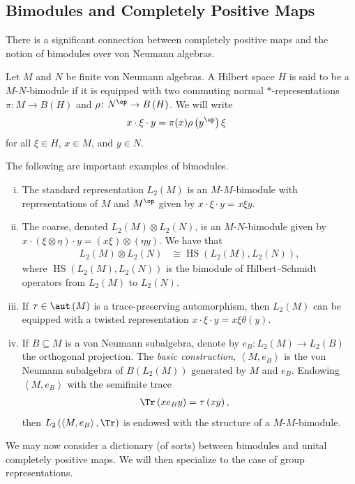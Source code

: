 \documentclass[10pt]{mypackage}
\begin{document}
\subsection{Bimodules and Completely Positive Maps}%
There is a significant connection between completely positive maps and the notion of bimodules over von Neumann algebras.
\begin{definition}
  Let $M$ and $N$ be finite von Neumann algebras. A Hilbert space $H$ is said to be a $M$-$N$-bimodule if it is equipped with two commuting normal $\ast$-representations $\pi\colon M\rightarrow B\left( H \right)$ and $\rho\colon N^{\op}\rightarrow B\left( H \right)$. We will write
  \begin{align*}
    x\cdot \xi \cdot y &= \pi(x)\rho\left( y^{\op} \right)\xi
  \end{align*}
  for all $\xi\in H$, $x\in M$, and $y\in N$.
\end{definition}
\begin{example}
  The following are important examples of bimodules.
  \begin{enumerate}[(i)]
    \item The standard representation $L_2\left( M \right)$ is an $M$-$M$-bimodule with representations of $M$ and $M^{\op}$ given by $x\cdot \xi \cdot y = x\xi y$.
    \item The coarse, denoted $L_2\left( M \right)\otimes L_2\left( N \right)$, is an $M$-$N$-bimodule given by $x\cdot \left( \xi\otimes \eta \right)\cdot y = \left( x\xi \right)\otimes \left( \eta y \right)$. We have that
      \begin{align*}
        L_2\left( M \right)\otimes L_2\left( N \right) &\cong \operatorname{HS}\left( L_2\left( M \right),L_2\left( N \right) \right),
      \end{align*}
      where $\operatorname{HS}\left( L_2\left( M \right),L_2\left( N \right) \right)$ is the bimodule of Hilbert--Schmidt operators from $L_2\left( M \right)$ to $L_2\left( N \right)$.
    \item If $\tau\in \aut\left( M \right)$ is a trace-preserving automorphism, then $L_2\left( M \right)$ can be equipped with a twisted representation $x\cdot \xi \cdot y = x\xi \theta\left( y \right)$.
    \item If $B\subseteq M$ is a von Neumann subalgebra, denote by $e_B\colon L_2\left( M \right)\rightarrow L_2\left( B \right)$ the orthogonal projection. The \textit{basic construction}, $ \left\langle M,e_B \right\rangle $ is the von Neumann subalgebra of $B\left( L_2\left( M \right) \right)$ generated by $M$ and $e_B$. Endowing $ \left\langle M,e_B \right\rangle $ with the semifinite trace
      \begin{align*}
        \Tr\left( xe_By \right) &= \tau\left( xy \right),
      \end{align*}
      then $L_2\left( \left\langle M,e_B \right\rangle,\Tr \right)$ is endowed with the structure of a $M$-$M$-bimodule. 
  \end{enumerate}
\end{example}
We may now consider a dictionary (of sorts) between bimodules and unital completely positive maps. We will then specialize to the case of group representations.
\end{document}
